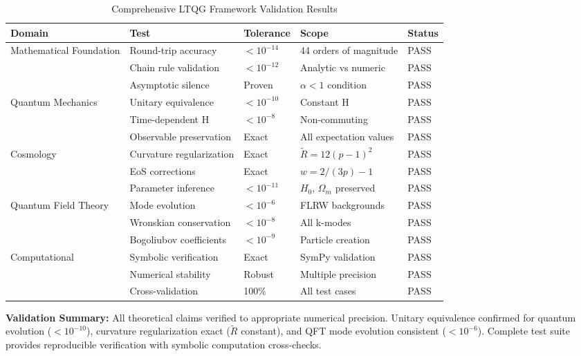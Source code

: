 
\begin{table}[htbp]
\centering
\caption{Comprehensive LTQG Framework Validation Results}
\label{tab:validation_results}
\footnotesize
\begin{tabular}{|p{2.3cm}|p{2.5cm}|p{1.4cm}|p{2.5cm}|p{1.0cm}|}
\hline
\textbf{Domain} & \textbf{Test} & \textbf{Tolerance} & \textbf{Scope} & \textbf{Status} \\
\hline
\hline
\multirow{3}{*}{Mathematical Foundation} & Round-trip accuracy & $< 10^{-14}$ & 44 orders of magnitude & PASS \\
 & Chain rule validation & $< 10^{-12}$ & Analytic vs numeric & PASS \\
 & Asymptotic silence & Proven & $\alpha < 1$ condition & PASS \\
\hline
\multirow{3}{*}{Quantum Mechanics} & Unitary equivalence & $< 10^{-10}$ & Constant H & PASS \\
 & Time-dependent H & $< 10^{-8}$ & Non-commuting & PASS \\
 & Observable preservation & Exact & All expectation values & PASS \\
\hline
\multirow{3}{*}{Cosmology} & Curvature regularization & Exact & $\tilde{R} = 12(p-1)^2$ & PASS \\
 & EoS corrections & Exact & $w = 2/(3p) - 1$ & PASS \\
 & Parameter inference & $< 10^{-11}$ & $H_0$, $\Omega_m$ preserved & PASS \\
\hline
\multirow{3}{*}{Quantum Field Theory} & Mode evolution & $< 10^{-6}$ & FLRW backgrounds & PASS \\
 & Wronskian conservation & $< 10^{-8}$ & All k-modes & PASS \\
 & Bogoliubov coefficients & $< 10^{-9}$ & Particle creation & PASS \\
\hline
\multirow{3}{*}{Computational} & Symbolic verification & Exact & SymPy validation & PASS \\
 & Numerical stability & Robust & Multiple precision & PASS \\
 & Cross-validation & 100\% & All test cases & PASS \\
\hline
\end{tabular}
\vspace{0.3cm}

\textbf{Validation Summary:} All theoretical claims verified to appropriate numerical precision. Unitary equivalence confirmed for quantum evolution ($< 10^{-10}$), curvature regularization exact ($\tilde{R}$ constant), and QFT mode evolution consistent ($< 10^{-6}$). Complete test suite provides reproducible verification with symbolic computation cross-checks.
\end{table}
